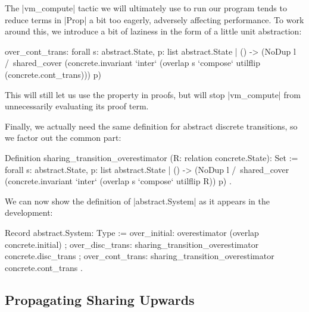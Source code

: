 \documentclass[runningheads]{llncs}
\begin{document}
The |vm_compute| tactic we will ultimately use to run our program tends to reduce terms in |Prop| a bit too eagerly, adversely affecting performance. To work around this, we introduce a bit of laziness in the form of a little unit abstraction:
\begin{code}
over_cont_trans: forall s: abstract.State,
  { p: list abstract.State | () -> (NoDup l /\ shared_cover
    (concrete.invariant `inter` (overlap s `compose` utilflip (concrete.cont_trans))) p) }
\end{code}
This will still let us use the property in proofs, but will stop |vm_compute| from unnecessarily evaluating its proof term.

Finally, we actually need the same definition for abstract discrete transitions, so we factor out the common part:
\begin{code}
Definition sharing_transition_overestimator
  (R: relation concrete.State): Set := forall s: abstract.State,
    { p: list abstract.State | () -> (NoDup l /\ shared_cover
      (concrete.invariant `inter` (overlap s `compose` utilflip R)) p) }.
\end{code}
We can now show the definition of |abstract.System| as it appears in the development:
\begin{code}
  Record abstract.System: Type :=
    { over_initial: overestimator (overlap concrete.initial)
    ; over_disc_trans: sharing_transition_overestimator concrete.disc_trans
    ; over_cont_trans: sharing_transition_overestimator concrete.cont_trans
    }.
\end{code}

\subsection{Propagating Sharing Upwards}
\end{document}
